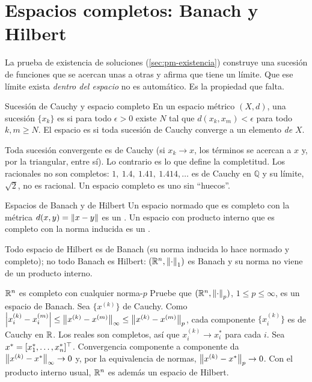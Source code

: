 \section{Espacios completos: Banach y Hilbert}
\label{sec:pm-completos}

La prueba de existencia de soluciones (\cref{sec:pm-existencia}) construye una sucesión de funciones que se acercan unas a otras y afirma que tiene un límite. Que ese límite exista \emph{dentro del espacio} no es automático. Es la propiedad que falta.

\begin{definicion}[label=def:pm-cauchy]{Sucesión de Cauchy y espacio completo}
En un espacio métrico $(X,d)$, una sucesión $\{x_k\}$ es  si para todo $\epsilon>0$ existe $N$ tal que $d(x_k,x_m)<\epsilon$ para todo $k,m\ge N$. El espacio es  si toda sucesión de Cauchy converge a un elemento \emph{de} $X$.
\end{definicion}

Toda sucesión convergente es de Cauchy (si $x_k\to x$, los términos se acercan a $x$ y, por la triangular, entre sí). Lo contrario es lo que define la completitud. Los racionales no son completos: $1,\ 1.4,\ 1.41,\ 1.414,\dots$ es de Cauchy en $\mathbb{Q}$ y su límite, $\sqrt2$, no es racional. Un espacio completo es uno sin ``huecos''.

\begin{definicion}[label=def:pm-banach]{Espacios de Banach y de Hilbert}
Un espacio normado que es completo con la métrica $d(x,y)=\left\lVert x-y\right\rVert$ es un . Un espacio con producto interno que es completo con la norma inducida es un .
\end{definicion}

Todo espacio de Hilbert es de Banach (su norma inducida lo hace normado y completo); no todo Banach es Hilbert: $(\mathbb{R}^n,\left\lVert \cdot\right\rVert_1)$ es Banach y su norma no viene de un producto interno.

\begin{ejemplo}[label=ej:pm-Rnbanach]{$\mathbb{R}^n$ es completo con cualquier norma-$p$}
Pruebe que $(\mathbb{R}^n,\left\lVert \cdot\right\rVert_p)$, $1\le p\le\infty$, es un espacio de Banach.
\solucion Sea $\{x^{(k)}\}$ de Cauchy. Como $\left\lvert x^{(k)}_i-x^{(m)}_i\right\rvert\le\left\lVert x^{(k)}-x^{(m)}\right\rVert_\infty\le\left\lVert x^{(k)}-x^{(m)}\right\rVert_p$, cada componente $\{x_i^{(k)}\}$ es de Cauchy en $\mathbb{R}$. Los reales son completos, así que $x_i^{(k)}\to x_i^*$ para cada $i$. Sea $x^*=[x_1^*,\dots,x_n^*]^{\top}$. Convergencia componente a componente da $\left\lVert x^{(k)}-x^*\right\rVert_\infty\to0$ y, por la equivalencia de normas, $\left\lVert x^{(k)}-x^*\right\rVert_p\to0$. Con el producto interno usual, $\mathbb{R}^n$ es además un espacio de Hilbert.
\end{ejemplo}

